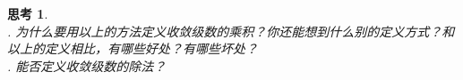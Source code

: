 \documentclass[12pt,UTF8]{ctexbook}
\theoremstyle{definition}
\theoremstyle{plain}
\newtheorem{sk}{思考}[section]
\begin{document}





\begin{sk}
    \mbox{} \\
    . 为什么要用以上的方法定义收敛级数的乘积？你还能想到什么别的定义方式？和以上的定义相比，有哪些好处？有哪些坏处？\\
    . 能否定义收敛级数的除法？
\end{sk}
\end{document}
